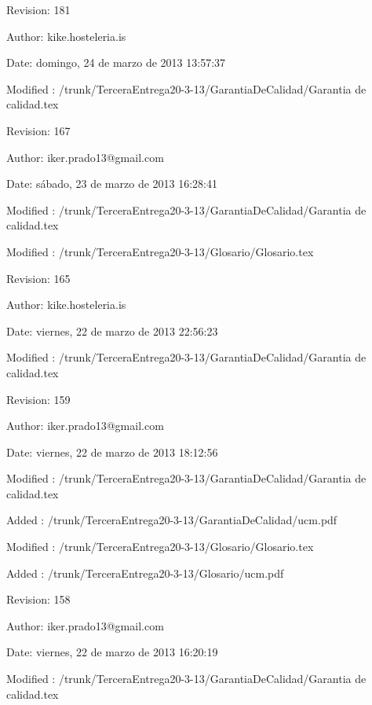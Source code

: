 \documentclass[spanish,a4paper,11pt, twoside]{report}	%
\begin{document}
	Revision: 181
	
	Author: kike.hosteleria.is
	
	Date: domingo, 24 de marzo de 2013 13:57:37
	
	Modified : /trunk/TerceraEntrega20-3-13/GarantiaDeCalidad/Garantia de calidad.tex

	\vspace{0.25cm}

	Revision: 167
	
	Author: iker.prado13@gmail.com
	
	Date: sábado, 23 de marzo de 2013 16:28:41
	
	Modified : /trunk/TerceraEntrega20-3-13/GarantiaDeCalidad/Garantia de calidad.tex
	
	Modified : /trunk/TerceraEntrega20-3-13/Glosario/Glosario.tex

	\vspace{0.25cm}

	Revision: 165
	
	Author: kike.hosteleria.is
	
	Date: viernes, 22 de marzo de 2013 22:56:23
	
	Modified : /trunk/TerceraEntrega20-3-13/GarantiaDeCalidad/Garantia de calidad.tex

	\vspace{0.25cm}

	Revision: 159
	
	Author: iker.prado13@gmail.com
	
	Date: viernes, 22 de marzo de 2013 18:12:56
	
	Modified : /trunk/TerceraEntrega20-3-13/GarantiaDeCalidad/Garantia de calidad.tex
	
	Added : /trunk/TerceraEntrega20-3-13/GarantiaDeCalidad/ucm.pdf
	
	Modified : /trunk/TerceraEntrega20-3-13/Glosario/Glosario.tex
	
	Added : /trunk/TerceraEntrega20-3-13/Glosario/ucm.pdf

	\vspace{0.25cm}

	Revision: 158
	
	Author: iker.prado13@gmail.com
	
	Date: viernes, 22 de marzo de 2013 16:20:19
	
	Modified : /trunk/TerceraEntrega20-3-13/GarantiaDeCalidad/Garantia de calidad.tex

	\vspace{0.25cm}
\end{document}
